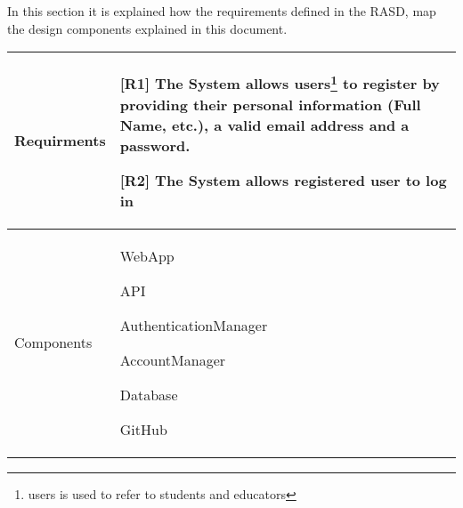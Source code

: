 In this section it is explained how the requirements defined in the RASD, map the design components explained in this document.
    \begin{table}[!h]
        \centering
        \begin{tabular}{ | m{6em} | m{30em} |} 
            \hline
             Requirments& [R1] The System allows users\footnote{users is used to refer to students and educators} to register by providing their personal information (Full Name, etc.), a valid email address and a password.
    
    
            [R2] The System allows registered user to log in \\
            \hline
             Components& WebApp

             API

             AuthenticationManager

             AccountManager

             Database
             
             GitHub\\
             \hline
        \end{tabular}
        \label{tab:my_label}
    \end{table}

